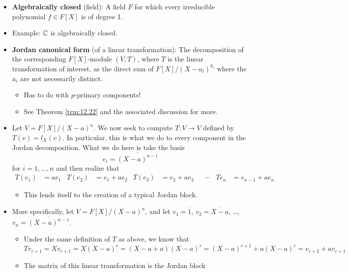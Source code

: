 \documentclass[../notes.tex]{subfiles}
\begin{document}
\begin{itemize}
\begin{itemize}
    \end{itemize}
    \item \textbf{Algebraically closed} (field): A field $F$ for which every irreducible polynomial $f\in F[X]$ is of degree 1.
    \item Example: $\mathbb{C}$ is algebraically closed.
    \item \textbf{Jordan canonical form} (of a linear transformation): The decomposition of the corresponding $F[X]$-module $(V,T)$, where $T$ is the linear transformation of interest, as the direct sum of $F[X]/(X-a_i)^{k_i}$ where the $a_i$ are not necessarily distinct.
    \begin{itemize}
        \item Has to do with $p$-primary components!
        \item See Theorem \ref{trm:12.22} and the associated discussion for more.
    \end{itemize}
    \item Let $V=F[X]/(X-a)^n$. We now seek to compute $T:V\to V$ defined by $T(v)=l_X(v)$. In particular, this is what we do to every component in the Jordan decomposition. What we do here is take the basis
    \begin{equation*}
        e_i = \overline{(X-a)^{n-i}}
    \end{equation*}
    for $i=1,\dots,n$ and then realize that
    \begin{align*}
        T(e_1) &= ae_1&
        T(e_2) &= e_1+ae_2&
        T(e_3) &= e_2+ae_3&
        &\cdots&
        Te_n &= e_{n-1}+ae_n
    \end{align*}
    \begin{itemize}
        \item This lends itself to the creation of a typical Jordan block.
    \end{itemize}
    \item More specifically, let $V=F[X]/(X-a)^n$, and let $v_1=\overline{1}$, $v_2=\overline{X-a}$, \dots, $v_n=\overline{(X-a)^{n-1}}$.
    \begin{itemize}
        \item Under the same definition of $T$ as above, we know that
        \begin{equation*}
            Tv_{r+1} = Xv_{r+1}
            = X(X-a)^r
            = (X-a+a)(X-a)^r
            = (X-a)^{r+1}+a(X-a)^r
            = v_{r+2}+av_{r+1}
        \end{equation*}
        \item The matrix of this linear transformation is the Jordan block

\end{itemize}
\end{itemize}
\end{document}
